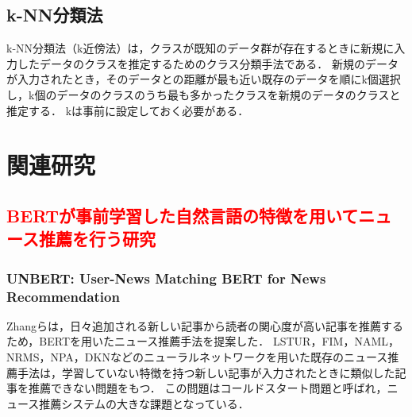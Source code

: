 \documentclass[12pt,a4j]{jreport}
\begin{document}



\section{k-NN分類法}
k-NN分類法（k近傍法）は，クラスが既知のデータ群が存在するときに新規に入力したデータのクラスを推定するためのクラス分類手法である\cite{aurellen20}．
新規のデータが入力されたとき，そのデータとの距離が最も近い既存のデータを順にk個選択し，k個のデータのクラスのうち最も多かったクラスを新規のデータのクラスと推定する．
kは事前に設定しておく必要がある．


\chapter{関連研究}
\label{chapter_related_studies}


\section{\textcolor{red}{BERTが事前学習した自然言語の特徴を用いてニュース推薦を行う研究}}



\subsection{UNBERT: User-News Matching BERT for News Recommendation}
Zhangらは，日々追加される新しい記事から読者の関心度が高い記事を推薦するため，BERTを用いたニュース推薦手法を提案した\cite{zhang_unbert_2021}．
LSTUR，FIM，NAML，NRMS，NPA，DKNなどのニューラルネットワークを用いた既存のニュース推薦手法は，学習していない特徴を持つ新しい記事が入力されたときに類似した記事を推薦できない問題をもつ．
この問題はコールドスタート問題と呼ばれ，ニュース推薦システムの大きな課題となっている．
\end{document}
